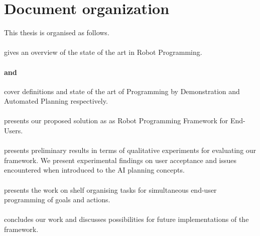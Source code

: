 \section{Document organization}
This thesis is organised as follows. 

\paragraph{} gives an overview of the state of the art in Robot Programming.

\paragraph{ and } cover definitions and state of the art of Programming by Demonstration and Automated Planning respectively.

\paragraph{} presents our proposed solution as as Robot Programming Framework for End-Users.


\paragraph{} presents preliminary results in terms of qualitative experiments for evaluating our framework. We present experimental findings on user acceptance and issues encountered when introduced to the AI planning concepts.

\paragraph{} presents the work on shelf organising tasks for simultaneous end-user programming of goals and actions.

\paragraph{} concludes our work and discusses possibilities for future implementations of the framework.
